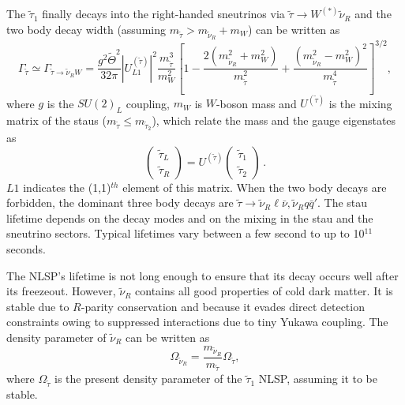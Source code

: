 \documentclass[10pt]{article}
\newcommand{\stau}{\tilde{\tau}}
\begin{document}
The $\tilde{\tau}_1$ finally decays into the right-handed sneutrinos via $\stau \to W^{(*)} \tilde{\nu}_R$ and the two body decay width (assuming $m_{\stau} > m_{\tilde{\nu}_R} + m_W$) can be written as
\begin{equation}
\Gamma_{\stau} \simeq \Gamma_{\stau \to \tilde{\nu}_R W} = \frac{g^2 \tilde\Theta^2}{32 \pi}|U_{L1}^{(\stau)}|^2 \frac{m_{\stau}^3}{m_W^2}\left[1 - \frac{2(m_{\tilde{\nu}_R}^2 + m_W^2)}{m_{\stau}^2} +  \frac{(m_{\tilde{\nu}_R}^2 - m_W^2)^2}{m_{\stau}^4}\right]^{3/2},
\end{equation}
where $g$ is the $SU(2)_L$ coupling, $m_W$ is $W$-boson mass and $U^{(\stau)}$ is the mixing matrix of the staus ($m_{\stau} \leq m_{\tilde{\tau}_2}$), which relate the mass and the gauge eigenstates as
\begin{equation}
\begin{pmatrix}
\tilde{\tau}_L \\
\tilde{\tau}_R
\end{pmatrix} = U^{(\tilde{\tau})}
\begin{pmatrix}
\tilde{\tau}_1 \\
\tilde{\tau}_2
\end{pmatrix}\,.
\end{equation}
$L1$ indicates the (1,1)$^{th}$ element of this matrix. When the two body decays are forbidden, the dominant three body decays are $\stau \to \tilde{\nu}_R \ell \bar{\nu}, \tilde{\nu}_R q \bar{q}'$. The stau lifetime depends on the decay modes and on the mixing in the stau and the sneutrino sectors. Typical lifetimes vary between a few second to up to 10$^{11}$ seconds.

The NLSP's lifetime is not long enough to ensure that its decay occurs well after its freezeout. However, $\tilde{\nu}_R$ contains all good properties of cold dark matter. It is stable due to $R$-parity conservation and because it evades direct detection constraints owing to suppressed interactions due to tiny Yukawa coupling. The density parameter of $\tilde{\nu}_R$ can be written as
\begin{equation}
\Omega_{\tilde{\nu}_R} = \frac{m_{\tilde{\nu}_R}}{m_{\stau}} \Omega_{\stau},
\end{equation}
where $\Omega_{\stau}$ is the present density parameter of the $\tilde{\tau}_1$ NLSP, assuming it to be stable.
\end{document}

